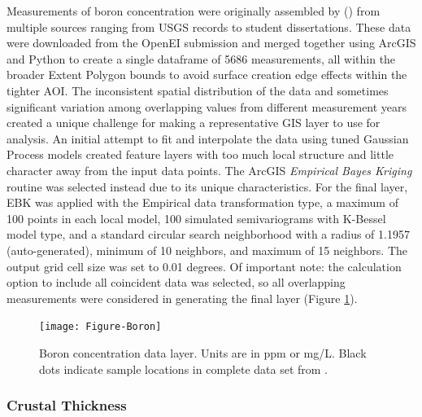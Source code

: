 Measurements of boron concentration were originally assembled by \citeauthor{bielicki_hydrogeolgic_2015} (\citeyear{bielicki_hydrogeolgic_2015}) from multiple sources ranging from USGS records to student dissertations. These data were downloaded from the OpenEI submission \citep{kelley_geothermal_2015} and merged together using ArcGIS and Python to create a single dataframe of 5686 measurements, all within the broader Extent Polygon bounds to avoid surface creation edge effects within the tighter AOI. The inconsistent spatial distribution of the data and sometimes significant variation among overlapping values from different measurement years created a unique challenge for making a representative GIS layer to use for analysis. An initial attempt to fit and interpolate the data using tuned Gaussian Process models created feature layers with too much local structure and little character away from the input data points. The ArcGIS \textit{Empirical Bayes Kriging} routine was selected instead due to its unique characteristics. For the final layer, EBK was applied with the Empirical data transformation type, a maximum of 100 points in each local model, 100 simulated semivariograms with K-Bessel model type, and a standard circular search neighborhood with a radius of 1.1957 (auto-generated), minimum of 10 neighbors, and maximum of 15 neighbors. The output grid cell size was set to 0.01 degrees. Of important note: the calculation option to include all coincident data was selected, so all overlapping measurements were considered in generating the final layer (Figure \ref{fig:feat_boron}).

\begin{figure}[!htp]
\centering
\texttt{[image: Figure-Boron]}
\caption[Boron concentration data layer]{Boron concentration data layer. Units are in ppm or mg/L. Black dots indicate sample locations in complete data set from \protect\citep{bielicki_hydrogeolgic_2015}.}
\label{fig:feat_boron}
\end{figure}

\subsubsection{Crustal Thickness}

